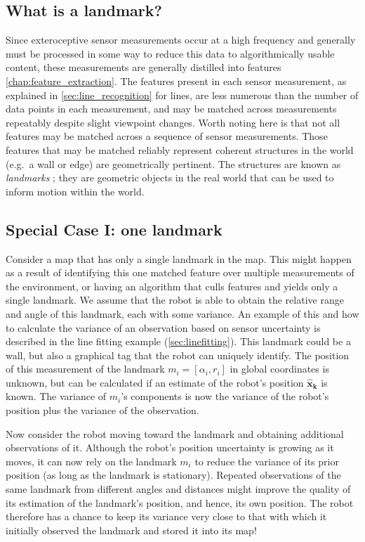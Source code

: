\subsection{What is a landmark?}
Since exteroceptive sensor measurements occur at a high frequency and generally must be processed in some way to reduce this data to algorithmically usable content, these measurements are generally distilled into features \cref{chap:feature_extraction}. The features present in each sensor measurement, as explained in \cref{sec:line_recognition} for lines, are less numerous than the number of data points in each measurement, and may be matched across measurements repeatably despite slight viewpoint changes. Worth noting here is that not all features may be matched across a sequence of sensor measurements. Those features that may be matched reliably represent coherent structures in the world (e.g.\ a wall or edge) are geometrically pertinent. The structures are known as \emph{landmarks} ; they are geometric objects in the real world that can be used to inform motion within the world.

\subsection{Special Case I: one landmark}
Consider a map that has only a single landmark in the map. This might happen as a result of identifying this one matched feature over multiple measurements of the environment, or having an algorithm that culls features and yields only a single landmark. We assume that the robot is able to obtain the relative range and angle of this landmark, each with some variance. An example of this and how to calculate the variance of an observation based on sensor uncertainty is described in the line fitting example (\cref{sec:linefitting}). This landmark could be a wall, but also a graphical tag that the robot can uniquely identify. The position of this measurement of the landmark $m_i=[\alpha_i,r_i]$  in global coordinates is unknown, but can be calculated if an estimate of the robot's position $\boldsymbol{\hat{x}_k}$ is known.  The variance of $ m_i$'s components is now the variance of the robot's position plus the variance of the observation.

Now consider the robot moving toward the landmark and obtaining additional observations of it. Although the robot's position uncertainty is growing as it moves, it can now rely on the landmark $m_i$ to reduce the variance of its prior position (as long as the landmark is stationary). Repeated observations of the same landmark from different angles and distances might improve the quality of its estimation of the landmark's position, and hence, its own position. The robot therefore has a chance to keep its variance very close to that with which it initially observed the landmark and stored it into its map!

